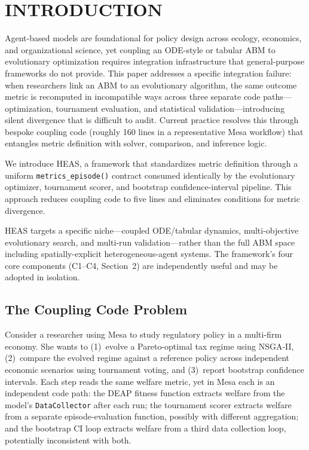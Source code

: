 \documentclass{wscpaperproc}
\begin{document}
\section{INTRODUCTION}

Agent-based models are foundational for policy design across ecology,
economics, and organizational science, yet coupling an ODE-style or tabular ABM
to evolutionary optimization requires integration infrastructure that
general-purpose frameworks do not provide. This paper addresses a specific
integration failure: when researchers link an ABM to an evolutionary algorithm,
the same outcome metric is recomputed in incompatible ways across three separate
code paths---optimization, tournament evaluation, and statistical
validation---introducing silent divergence that is difficult to audit. Current
practice resolves this through bespoke coupling code (roughly 160 lines in a
representative Mesa workflow) that entangles metric definition with solver,
comparison, and inference logic.

We introduce HEAS, a framework that standardizes metric definition through a
uniform \texttt{metrics\_episode()} contract consumed identically by the
evolutionary optimizer, tournament scorer, and bootstrap confidence-interval
pipeline. This approach reduces coupling code to five lines and eliminates
conditions for metric divergence.

HEAS targets a specific niche---coupled ODE/tabular dynamics, multi-objective
evolutionary search, and multi-run validation---rather than the full ABM space
including spatially-explicit heterogeneous-agent systems. The framework's four
core components (C1--C4, Section~2) are independently useful and may be adopted
in isolation.

\subsection{The Coupling Code Problem}

Consider a researcher using Mesa to study regulatory policy in a multi-firm
economy. She wants to (1)~evolve a Pareto-optimal tax regime using NSGA-II,
(2)~compare the evolved regime against a reference policy across independent
economic scenarios using tournament voting, and (3)~report bootstrap confidence
intervals. Each step reads the same welfare metric, yet in Mesa each is an
independent code path: the DEAP fitness function extracts welfare from the
model's \texttt{DataCollector} after each run; the tournament scorer extracts
welfare from a separate episode-evaluation function, possibly with different
aggregation; and the bootstrap CI loop extracts welfare from a third data
collection loop, potentially inconsistent with both.
\end{document}
